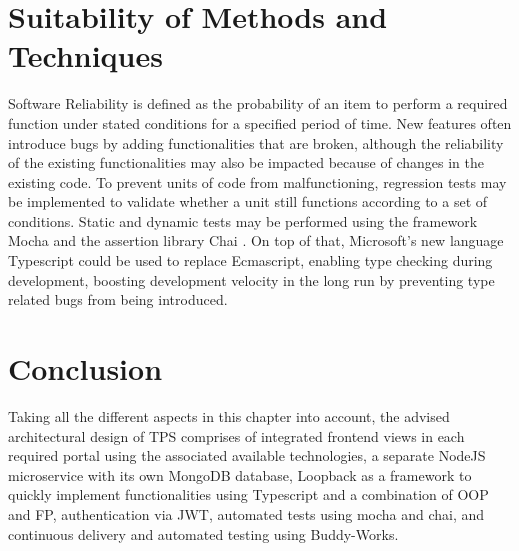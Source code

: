 \section{Suitability of Methods and Techniques}
Software Reliability is defined as the probability of an item to perform a required function under stated conditions for a specified period of time. New features often introduce bugs by adding functionalities that are broken, although the reliability of the existing functionalities may also be impacted because of changes in the existing code. To prevent units of code from malfunctioning, regression tests may be implemented to validate whether a unit still functions according to a set of conditions. Static and dynamic tests may be performed using the framework Mocha \cite{mocha} and the assertion library Chai \cite{chai}. On top of that, Microsoft’s new language Typescript could be used to replace Ecmascript, enabling type checking during development, boosting development velocity in the long run by preventing type related bugs from being introduced.






%
\section{Conclusion}
Taking all the different aspects in this chapter into account, the advised architectural design of TPS comprises of integrated frontend views in each required portal using the associated available technologies, a separate NodeJS microservice with its own MongoDB database, Loopback as a framework to quickly implement functionalities using Typescript and a combination of OOP and FP, authentication via JWT, automated tests using mocha and chai, and continuous delivery and automated testing using Buddy-Works.
